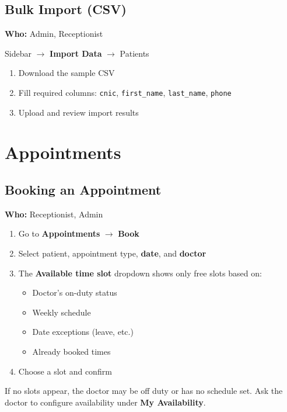 \documentclass[11pt,a4paper]{report}
\begin{document}
\section{Bulk Import (CSV)}

\textbf{Who:} Admin, Receptionist

Sidebar $\rightarrow$ \textbf{Import Data} $\rightarrow$ Patients

\begin{enumerate}[noitemsep]
    \item Download the sample CSV
    \item Fill required columns: \texttt{cnic}, \texttt{first\_name}, \texttt{last\_name}, \texttt{phone}
    \item Upload and review import results
\end{enumerate}

\chapter{Appointments}

\section{Booking an Appointment}

\textbf{Who:} Receptionist, Admin

\begin{enumerate}
    \item Go to \textbf{Appointments} $\rightarrow$ \textbf{Book}
    \item Select patient, appointment type, \textbf{date}, and \textbf{doctor}
    \item The \textbf{Available time slot} dropdown shows only free slots based on:
    \begin{itemize}[noitemsep]
        \item Doctor's on-duty status
        \item Weekly schedule
        \item Date exceptions (leave, etc.)
        \item Already booked times
    \end{itemize}
    \item Choose a slot and confirm
\end{enumerate}

\begin{warningbox}
If no slots appear, the doctor may be off duty or has no schedule set. Ask the doctor to configure availability under \textbf{My Availability}.
\end{warningbox}
\end{document}
